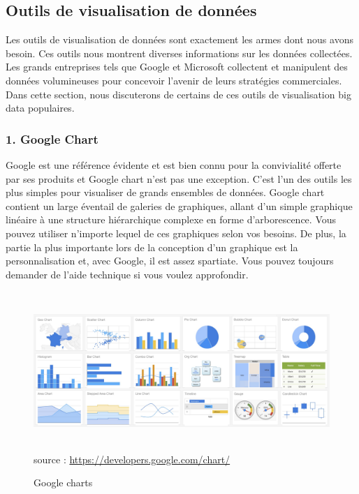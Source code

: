 \documentclass[french, a4paper, 12pt]{report}
\begin{document}

\subsection{Outils de visualisation de données }
Les outils de visualisation de données sont exactement les armes dont nous avons besoin. Ces outils nous montrent diverses informations sur les données collectées. Les grands entreprises tels que Google et Microsoft collectent et manipulent des données volumineuses pour concevoir l'avenir de leurs stratégies commerciales. Dans cette section, nous discuterons de certains de ces outils de visualisation big data populaires.\\

\subsubsection{1. Google Chart}
Google est une référence évidente et est bien connu pour la convivialité offerte par ses produits et Google chart n’est pas une exception. C'est l'un des outils les plus simples pour visualiser de grands ensembles de données. Google chart contient un large éventail de galeries de graphiques, allant d'un simple graphique linéaire à une structure hiérarchique complexe en forme d'arborescence. Vous pouvez utiliser n'importe lequel de ces graphiques selon vos besoins. De plus, la partie la plus importante lors de la conception d’un graphique est la personnalisation et, avec Google, il est assez spartiate. Vous pouvez toujours demander de l’aide technique si vous voulez approfondir.
\begin{figure}[!htp]
    \centering
    \includegraphics[height=6cm]{images/googlecharts.jpg}
    \scriptsize{source : \url{https://developers.google.com/chart/}}
    \caption{Google charts}
    \label{fig:2.13}
\end{figure}
\end{document}
